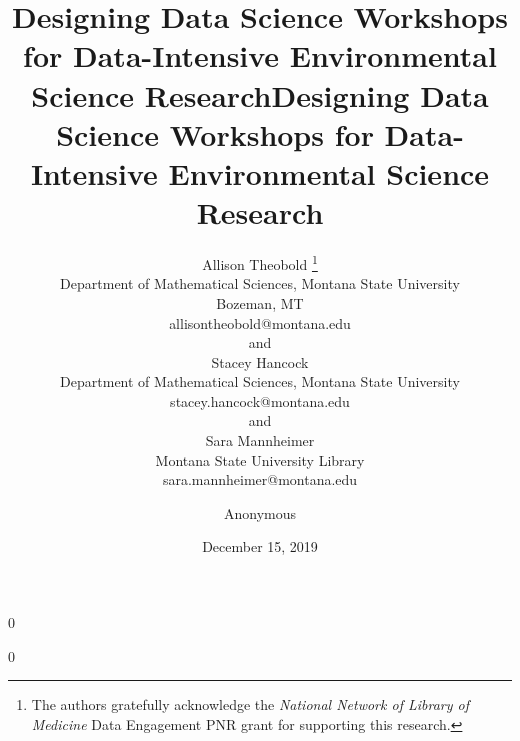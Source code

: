 \documentclass[12pt]{article}
\date{December 15, 2019}
\newcommand{\blind}{0}
\begin{document}
\def\spacingset#1{\renewcommand{\baselinestretch}%
{#1}\small\normalsize} \spacingset{1}



\blind
{
  \title{\bf Designing Data Science Workshops for Data-Intensive Environmental 
  Science Research}
  \author{Allison Theobold \thanks{The authors gratefully acknowledge the 
  \textit{National Network of Library of Medicine}
    Data Engagement PNR grant for supporting this research.} \hspace{.2cm}\\
    Department of Mathematical Sciences, Montana State University \\
    Bozeman, MT \\
    allisontheobold@montana.edu \\
    and \\
    Stacey Hancock \\
    Department of Mathematical Sciences, Montana State University \\
    stacey.hancock@montana.edu \\
    and \\
    Sara Mannheimer \\
    Montana State University Library \\
    sara.mannheimer@montana.edu
    }
  \maketitle 
} \fi

\blind
{
  \title{\bf Designing Data Science Workshops for Data-Intensive Environmental Science Research}
  \author{Anonymous}
  \date{}
  \maketitle
} \fi

\bigskip
\end{document}
